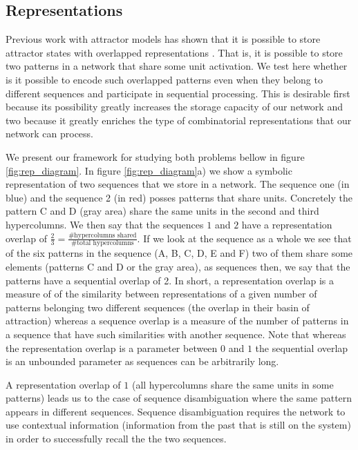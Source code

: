 \documentclass[10pt,a4paper]{article}
\begin{document}
\subsection{Representations}

Previous work with attractor models has shown that it is possible to store attractor states with overlapped representations \cite{meli2013modular} \cite{sandberg2002bayesian}. That is, it is possible to store two patterns in a network that share some unit activation. We test here whether is it possible to encode such overlapped patterns even when they belong to different sequences and participate in sequential processing. This is desirable first because its possibility greatly increases the storage capacity of our network and two because it greatly enriches the type of combinatorial representations that our network can process. 

We present our framework for studying both problems bellow in figure \ref{fig:rep_diagram}. In figure \ref{fig:rep_diagram}a) we show a symbolic representation of two sequences that we store in a network. The sequence one (in blue) and the sequence 2 (in red) posses patterns that share units. Concretely the pattern C and D (gray area) share the same units in the second and third hypercolumns. We then say that the sequences $1$ and $2$ have a representation overlap of $\frac{2}{3} = \frac{\text{\# hypercolumns shared}}{\text{\# total hypercolumns}}$. If we look at the sequence as a whole we see that of the six patterns in the sequence (A, B, C, D, E and F) two of them share some elements (patterns C and D or the gray area), as sequences then, we say that the patterns have a sequential overlap of 2. In short, a representation overlap is a measure of of the similarity between representations of a given number of patterns belonging two different sequences (the overlap in their basin of attraction) whereas a sequence overlap is a measure of the number of patterns in a sequence that have such similarities with another sequence. Note that whereas the representation overlap is a parameter between $0$ and $1$ the sequential overlap is an unbounded parameter as sequences can be arbitrarily long.
 
A representation overlap of $1$ (all hypercolumns share the same units in some patterns) leads us to the case of sequence disambiguation where the same pattern appears in different sequences. Sequence disambiguation requires the network to use contextual information (information from the past that is still on the system) in order to successfully recall the the two sequences.
\end{document}
